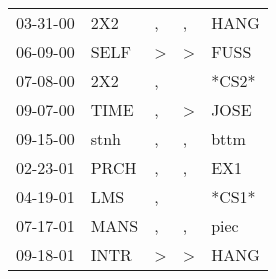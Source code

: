 \begin{supertabular}{lllll}
 03-31-00 &   2X2 &                , &             , &   HANG \\
 06-09-00 &  SELF &     \textgreater &  \textgreater &   FUSS \\
 07-08-00 &   2X2 &                , &               &  *CS2* \\
 09-07-00 &  TIME &                , &  \textgreater &   JOSE \\
 09-15-00 &  stnh &                , &             , &   bttm \\
 02-23-01 &  PRCH &                , &             , &    EX1 \\
 04-19-01 &   LMS &                , &               &  *CS1* \\
 07-17-01 &  MANS &                , &             , &   piec \\
 09-18-01 &  INTR &     \textgreater &  \textgreater &   HANG \\
\end{supertabular}
